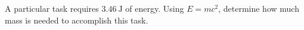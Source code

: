 A particular task requires $3.46\ \mathrm{J}$ of energy. 
Using $E = mc^2$, determine how much mass is needed to accomplish this task.